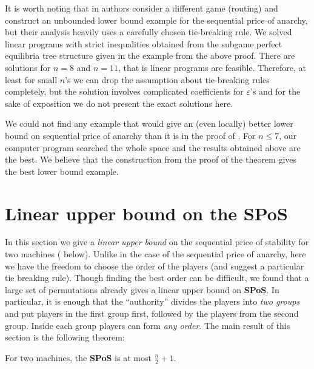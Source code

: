 \documentclass[runningheads]{llncs}
\newcommand{\pp}[1]{\todo[color=blue!40!white]{\scriptsize Pao: #1}}
\renewcommand{\epsilon}{\varepsilon}
\newcommand{\SPoS}{\textbf{SPoS}\xspace}
\begin{document}
\begin{remark}\label{rem:tie-breaking}
It is worth noting that in \cite{SPOAcongestion} authors consider a different game (routing) and construct an unbounded lower bound example for the sequential price of anarchy, but their analysis heavily uses a carefully chosen tie-breaking rule. We solved linear programs with strict inequalities obtained from the subgame perfect equilibria tree structure given in the example from the above proof. There are solutions for $n=8$ and $n=11$, that is linear programs are feasible. Therefore, at least for small $n$'s we can drop the assumption about tie-breaking rules completely, but the solution involves complicated coefficients for $\epsilon$'s and for the sake of exposition we do not present the exact solutions here. %
\end{remark}


\begin{remark}
We could not find any example that would give an (even locally) better lower bound on sequential price of anarchy than it is in the proof of . For $n\leq 7$, our computer program searched the whole space and the results obtained above are the best. We believe that the construction from the proof of the theorem gives the best lower bound example. 
\end{remark}

\section{Linear upper bound on the \SPoS}
\label{sec:linear_upper_bound}

In this section we give a \emph{linear upper bound} on the  sequential price of stability for two machines ( below). Unlike in the case of the sequential price of anarchy, here we have the freedom to  choose the order of the players (and suggest a particular tie breaking rule). Though finding the best order can be difficult, we found that a large set of permutations already gives a linear upper bound on \SPoS. In particular, it is enough that the ``authority'' divides the players into \emph{two groups} and put players in the first group first, followed by the players from the second group. Inside each group players can form \emph{any order}. The main result of this section is the following theorem:

\begin{theorem}\label{th:SPoS}
For two machines, the \SPoS is at most $\frac{n}{2}+1$.
\end{theorem}
\end{document}
